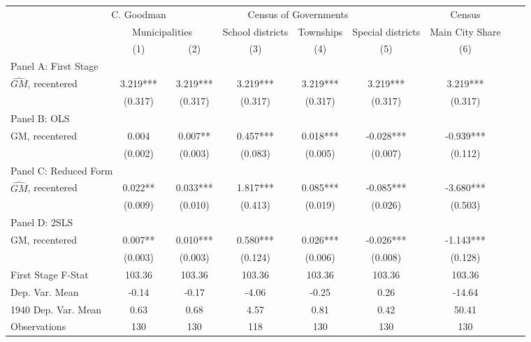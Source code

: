  \begin{tabular}{l*{8}{c}} \toprule
&\multicolumn{1}{c}{C. Goodman}&\multicolumn{4}{c}{Census of Governments}&\multicolumn{1}{c}{Census}\\\cmidrule(lr){2-2}\cmidrule(lr){3-6}\cmidrule(lr){7-7}
&\multicolumn{2}{c}{Municipalities}&\multicolumn{1}{c}{School districts}&\multicolumn{1}{c}{Townships}&\multicolumn{1}{c}{Special districts}&\multicolumn{1}{c}{Main City Share}\\\cmidrule(lr){2-3}\cmidrule(lr){4-6}\cmidrule(lr){7-7}
&\multicolumn{1}{c}{(1)}&\multicolumn{1}{c}{(2)}&\multicolumn{1}{c}{(3)}&\multicolumn{1}{c}{(4)}&\multicolumn{1}{c}{(5)}&\multicolumn{1}{c}{(6)}\\
\cmidrule(lr){1-7}
\multicolumn{6}{l}{Panel A: First Stage}\\
\cmidrule(lr){1-7}
$\widehat{GM}$, recentered&    3.219***&    3.219***&    3.219***&    3.219***&    3.219***&    3.219***\\
                &  (0.317)   &  (0.317)   &  (0.317)   &  (0.317)   &  (0.317)   &  (0.317)   \\
\cmidrule(lr){1-7}
\multicolumn{6}{l}{Panel B: OLS}\\
\cmidrule(lr){1-7}
GM, recentered  &    0.004   &    0.007** &    0.457***&    0.018***&   -0.028***&   -0.939***\\
                &  (0.002)   &  (0.003)   &  (0.083)   &  (0.005)   &  (0.007)   &  (0.112)   \\
\cmidrule(lr){1-7}
\multicolumn{6}{l}{Panel C: Reduced Form}\\
\cmidrule(lr){1-7}
$\widehat{GM}$, recentered&    0.022** &    0.033***&    1.817***&    0.085***&   -0.085***&   -3.680***\\
                &  (0.009)   &  (0.010)   &  (0.413)   &  (0.019)   &  (0.026)   &  (0.503)   \\
\cmidrule(lr){1-7}
\multicolumn{6}{l}{Panel D: 2SLS}\\
\cmidrule(lr){1-7}
GM, recentered  &    0.007** &    0.010***&    0.580***&    0.026***&   -0.026***&   -1.143***\\
                &  (0.003)   &  (0.003)   &  (0.124)   &  (0.006)   &  (0.008)   &  (0.128)   \\
\midrule
First Stage F-Stat&   103.36   &   103.36   &   103.36   &   103.36   &   103.36   &   103.36   \\
Dep. Var. Mean  &    -0.14   &    -0.17   &    -4.06   &    -0.25   &     0.26   &   -14.64   \\
1940 Dep. Var. Mean&     0.63   &     0.68   &     4.57   &     0.81   &     0.42   &    50.41   \\
Observations    &      130   &      130   &      118   &      130   &      130   &      130   \\
       \bottomrule \end{tabular}
